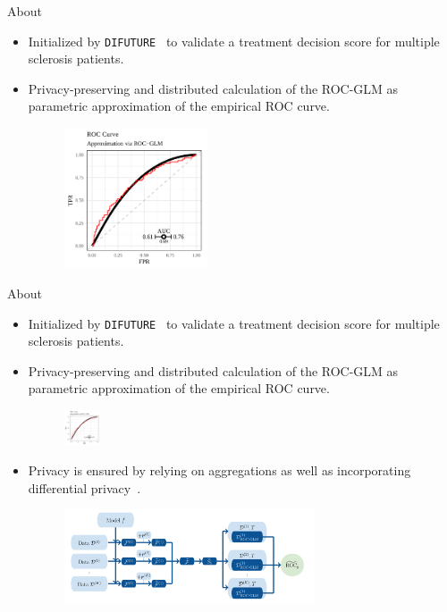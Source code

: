 \documentclass[t,10pt]{beamer}
\newcommand{\backupend}{
   \setcounter{framenumber}{\value{finalframe}}
}
\begin{document}
\begin{frame}{About}
  \begin{itemize}
    \item Initialized by \texttt{DIFUTURE}~\citep{DIFUTURE2018} to validate a treatment decision score for multiple sclerosis patients.
    \item Privacy-preserving and distributed calculation of the ROC-GLM as parametric approximation of the empirical ROC curve.
      \begin{figure}
        \centering
        \includegraphics[width=0.4\textwidth]{figures/fig-dauc-appr.png}
      \end{figure}
  \end{itemize}
\end{frame}

\begin{frame}{About}
  \begin{itemize}
    \item Initialized by \texttt{DIFUTURE}~\citep{DIFUTURE2018} to validate a treatment decision score for multiple sclerosis patients.
    \item Privacy-preserving and distributed calculation of the ROC-GLM as parametric approximation of the empirical ROC curve.
      \begin{figure}
        \centering
        \includegraphics[width=0.1\textwidth]{figures/fig-dauc-appr.png}
      \end{figure}
    \item Privacy is ensured by relying on aggregations as well as incorporating differential privacy~\citep{dwork2006differential}.
      \begin{figure}
        \centering
        \includegraphics[width=0.7\textwidth]{figures/fig-dauc-algo.png}
      \end{figure}
  \end{itemize}
	\addtocounter{framenumber}{-1}
\end{frame}



\backupend
\end{document}
